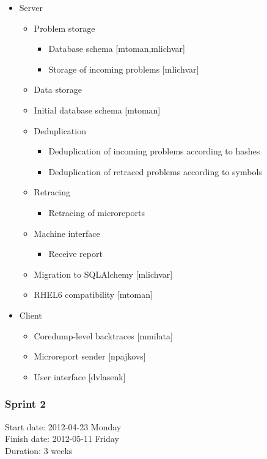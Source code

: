 \documentclass{article}
\begin{document}
\begin{itemize}
\item Server
  \begin{itemize}
  \item Problem storage
    \begin{itemize}
    \item Database schema [mtoman,mlichvar]
    \item Storage of incoming problems [mlichvar]
    \end{itemize}
  \item Data storage
    \item Initial database schema [mtoman]
  \item Deduplication
    \begin{itemize}
    \item Deduplication of incoming problems according to hashes
    \item Deduplication of retraced problems according to symbols
    \end{itemize}
  \item Retracing
    \begin{itemize}
    \item Retracing of microreports
    \end{itemize}
  \item Machine interface
    \begin{itemize}
    \item Receive report
    \end{itemize}
  \item Migration to SQLAlchemy [mlichvar]
  \item RHEL6 compatibility [mtoman]
  \end{itemize}
\item Client
  \begin{itemize}
  \item Coredump-level backtraces [mmilata]
  \item Microreport sender [npajkovs]
  \item User interface [dvlasenk]
  \end{itemize}
\end{itemize}

\subsubsection{Sprint 2}
Start date: 2012-04-23 Monday \\
Finish date: 2012-05-11 Friday \\
Duration: 3 weeks
\end{document}
